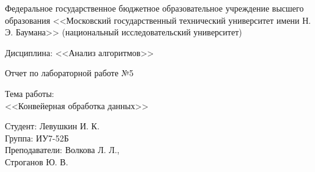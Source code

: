 \documentclass[a4paper,12pt]{article}
\begin{document}


\large
\begin{center}
	Федеральное государственное бюджетное образовательное учреждение 
	высшего образования <<Московский государственный технический 
	университет имени Н. Э. Баумана>> 
	(национальный исследовательский университет)
\end{center}

\vspace*{30mm} 


\huge
\begin{center}
	Дисциплина: <<Анализ алгоритмов>>
	
	Отчет по лабораторной работе №5
\end{center}

\vspace*{30mm} 

\huge
\begin{center}
	Тема работы:\\
	<<Конвейерная обработка данных>>
\end{center}
\vspace*{30mm} 

\large
\begin{flushright}
	Студент: Левушкин И. К. \\
	Группа: ИУ7-52Б \\
	Преподаватели: Волкова Л. Л., \\ Строганов Ю. В. \\
\end{flushright}
\end{document}
